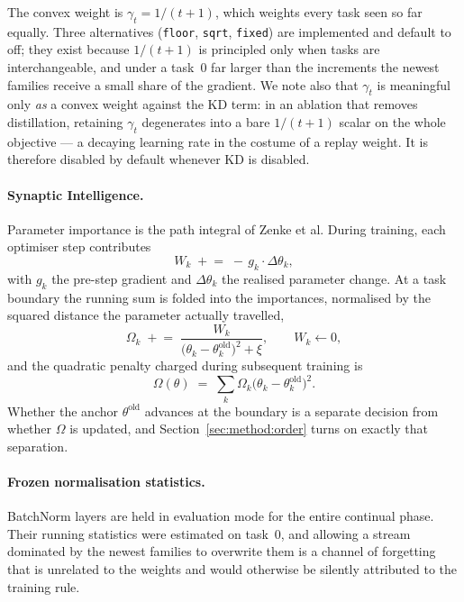The convex weight is $\gamma_t = 1/(t+1)$, which weights every task seen so far
equally. Three alternatives (\texttt{floor}, \texttt{sqrt}, \texttt{fixed}) are
implemented and default to off; they exist because $1/(t+1)$ is principled only
when tasks are interchangeable, and under a task~0 far larger than the
increments the newest families receive a small share of the gradient. We note
also that $\gamma_t$ is meaningful only \emph{as} a convex weight against the KD
term: in an ablation that removes distillation, retaining $\gamma_t$ degenerates
into a bare $1/(t+1)$ scalar on the whole objective --- a decaying learning rate
in the costume of a replay weight. It is therefore disabled by default whenever
KD is disabled.

\paragraph{Synaptic Intelligence.}
Parameter importance is the path integral of Zenke et al. During training, each
optimiser step contributes
\begin{equation}
  \label{eq:si-accum}
  W_k \;\mathrel{+}=\; -\,g_k \cdot \Delta\theta_k,
\end{equation}
with $g_k$ the pre-step gradient and $\Delta\theta_k$ the realised parameter
change. At a task boundary the running sum is folded into the importances,
normalised by the squared distance the parameter actually travelled,
\begin{equation}
  \label{eq:si-omega}
  \Omega_k \;\mathrel{+}=\;
    \frac{W_k}{\big(\theta_k - \theta^{\text{old}}_k\big)^{2} + \xi},
  \qquad W_k \leftarrow 0,
\end{equation}
and the quadratic penalty charged during subsequent training is
\begin{equation}
  \label{eq:si-penalty}
  \Omega(\theta) \;=\; \sum_k \Omega_k \big(\theta_k - \theta^{\text{old}}_k\big)^{2}.
\end{equation}
Whether the anchor $\theta^{\text{old}}$ advances at the boundary is a separate
decision from whether $\Omega$ is updated, and Section~\ref{sec:method:order}
turns on exactly that separation.

\paragraph{Frozen normalisation statistics.}
BatchNorm layers are held in evaluation mode for the entire continual phase.
Their running statistics were estimated on task~0, and allowing a stream
dominated by the newest families to overwrite them is a channel of forgetting
that is unrelated to the weights and would otherwise be silently attributed to
the training rule.

